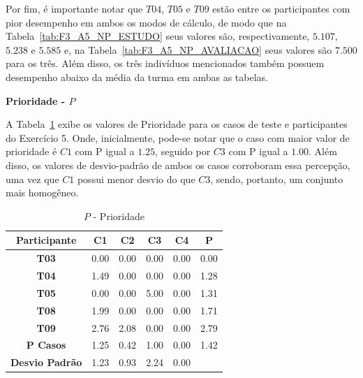 Por fim, é importante notar que $T04$, $T05$ e $T09$ estão entre os participantes com pior desempenho em ambos os modos de cálculo, de modo que na Tabela~\ref{tab:F3_A5_NP_ESTUDO} seus valores são, respectivamente, $5.107$, $5.238$ e $5.585$ e, na Tabela~\ref{tab:F3_A5_NP_AVALIACAO} seus valores são $7.500$ para os três. Além disso, os três indivíduos mencionados também possuem desempenho abaixo da média da turma em ambas as tabelas.

\textbf{Prioridade - $P$}

A Tabela~\ref{tab:F3_A5_P} exibe os valores de Prioridade para os casos de teste e participantes do Exercício 5. Onde, inicialmente, pode-se notar que o caso com maior valor de prioridade é $C1$ com P igual a $1.25$, seguido por $C3$ com P igual a $1.00$. Além disso, os valores de desvio-padrão de ambos os casos corroboram essa percepção, uma vez que $C1$ possui menor desvio do que $C3$, sendo, portanto, um conjunto mais homogêneo. 

\begin{table}[htbp]
	\centering
	\caption{$P$ - Prioridade}
	\begin{tabular}{|c|c|c|c|c|c}
		\hline
		\rowcolor[HTML]{D9D9D9} 
		\textbf{Participante} & \textbf{C1} & \textbf{C2} & \textbf{C3} & \textbf{C4} & \multicolumn{1}{c|}{\cellcolor[HTML]{D9D9D9}\textbf{P}} \\ \hline
		\rowcolor[HTML]{FFFFFF} 
		\textbf{T03} & 0.00 & 0.00 & 0.00 & 0.00 & \multicolumn{1}{c|}{\cellcolor[HTML]{FFFFFF}0.00} \\ \hline
		\rowcolor[HTML]{E7E6E6} 
		\textbf{T04} & 1.49 & 0.00 & 0.00 & 0.00 & \multicolumn{1}{c|}{\cellcolor[HTML]{E7E6E6}1.28} \\ \hline
		\rowcolor[HTML]{FFFFFF} 
		\textbf{T05} & 0.00 & 0.00 & 5.00 & 0.00 & \multicolumn{1}{c|}{\cellcolor[HTML]{FFFFFF}1.31} \\ \hline
		\rowcolor[HTML]{E7E6E6} 
		\textbf{T08} & 1.99 & 0.00 & 0.00 & 0.00 & \multicolumn{1}{c|}{\cellcolor[HTML]{E7E6E6}1.71} \\ \hline
		\rowcolor[HTML]{FFFFFF} 
		\textbf{T09} & 2.76 & 2.08 & 0.00 & 0.00 & \multicolumn{1}{c|}{\cellcolor[HTML]{FFFFFF}2.79} \\ \hline
		\rowcolor[HTML]{D0CECE} 
		\textbf{P Casos} & 1.25 & 0.42 & 1.00 & 0.00 & \multicolumn{1}{c|}{\cellcolor[HTML]{D0CECE}1.42} \\ \hline
		\cellcolor[HTML]{FFFFFF}\textbf{Desvio Padrão} & \cellcolor[HTML]{FFFFFF}1.23 & \cellcolor[HTML]{FFFFFF}0.93 & \cellcolor[HTML]{FFFFFF}2.24 & \cellcolor[HTML]{FFFFFF}0.00 & \multicolumn{1}{l}{} \\ \cline{1-5}
	\end{tabular}
	\label{tab:F3_A5_P}
\end{table}

